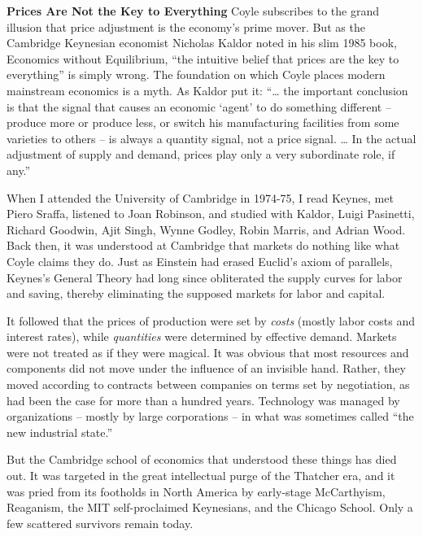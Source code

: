\documentclass[
]{book}
\begin{document}
\textbf{Prices Are Not the Key to Everything}
Coyle subscribes to the grand illusion that price adjustment is the economy's prime mover. But as the Cambridge Keynesian economist Nicholas Kaldor noted in his slim 1985 book, Economics without Equilibrium, ``the intuitive belief that prices are the key to everything'' is simply wrong. The foundation on which Coyle places modern mainstream economics is a myth. As Kaldor put it: ``\ldots{} the important conclusion is that the signal that causes an economic `agent' to do something different -- produce more or produce less, or switch his manufacturing facilities from some varieties to others -- is always a quantity signal, not a price signal. \ldots{} In the actual adjustment of supply and demand, prices play only a very subordinate role, if any.''

When I attended the University of Cambridge in 1974-75, I read Keynes, met Piero Sraffa, listened to Joan Robinson, and studied with Kaldor, Luigi Pasinetti, Richard Goodwin, Ajit Singh, Wynne Godley, Robin Marris, and Adrian Wood. Back then, it was understood at Cambridge that markets do nothing like what Coyle claims they do. Just as Einstein had erased Euclid's axiom of parallels, Keynes's General Theory had long since obliterated the supply curves for labor and saving, thereby eliminating the supposed markets for labor and capital.

It followed that the prices of production were set by \emph{costs} (mostly labor costs and interest rates), while \emph{quantities} were determined by effective demand. Markets were not treated as if they were magical. It was obvious that most resources and components did not move under the influence of an invisible hand. Rather, they moved according to contracts between companies on terms set by negotiation, as had been the case for more than a hundred years. Technology was managed by organizations -- mostly by large corporations -- in what was sometimes called ``the new industrial state.''

But the Cambridge school of economics that understood these things has died out. It was targeted in the great intellectual purge of the Thatcher era, and it was pried from its footholds in North America by early-stage McCarthyism, Reaganism, the MIT self-proclaimed Keynesians, and the Chicago School. Only a few scattered survivors remain today.
\end{document}
